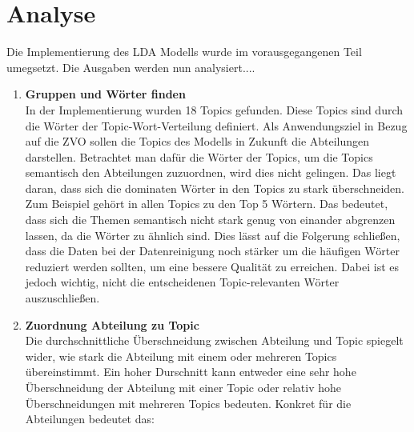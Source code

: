 \documentclass[german,version-2020-11]{uzl-thesis}
\begin{document}






	
\chapter{Analyse}%
Die Implementierung des LDA Modells wurde im vorausgegangenen Teil umegsetzt. Die Ausgaben werden nun analysiert....

\begin{enumerate}
\item \textbf{Gruppen und Wörter finden}\\
In der Implementierung wurden 18 Topics gefunden. Diese Topics sind durch die Wörter der Topic-Wort-Verteilung definiert. Als Anwendungsziel in Bezug auf die ZVO sollen die Topics des Modells in Zukunft die Abteilungen darstellen. Betrachtet man dafür die Wörter der Topics, um die Topics semantisch den Abteilungen zuzuordnen, wird dies nicht gelingen. Das liegt daran, dass sich die dominaten Wörter in den Topics zu stark überschneiden. Zum Beispiel gehört  in allen Topics zu den Top 5 Wörtern. Das bedeutet, dass sich die Themen semantisch nicht stark genug von einander abgrenzen lassen, da die Wörter zu ähnlich sind. Dies lässt auf die Folgerung schließen, dass die Daten bei der Datenreinigung noch stärker um die  häufigen Wörter reduziert werden sollten, um eine bessere Qualität zu erreichen. Dabei ist es jedoch wichtig, nicht die entscheidenen Topic-relevanten Wörter auszuschließen.
\\
\item \textbf{Zuordnung Abteilung zu Topic}\\
Die durchschnittliche Überschneidung zwischen Abteilung und Topic spiegelt wider, wie stark die Abteilung mit einem oder mehreren Topics übereinstimmt. Ein hoher Durschnitt kann entweder eine sehr hohe Überschneidung der Abteilung mit einer Topic oder relativ hohe Überschneidungen mit mehreren Topics bedeuten. Konkret für die Abteilungen bedeutet das: 
\end{enumerate}
\end{document}
